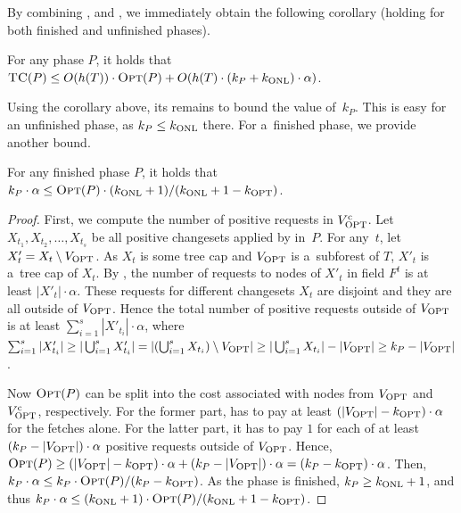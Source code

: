 By combining ,  and 
, we immediately obtain the following corollary
(holding for both finished and unfinished phases).

\begin{corollary}
\label{cor:any_phase_bound}
For any phase $P$, it holds that 
$\textsc{TC}(P) \leq O(h(T)) \cdot \textsc{Opt}(P) + O(h(T) \cdot (k_P + k_\textnormal{ONL}) \cdot \alpha)$.
\end{corollary}

Using the corollary above, its remains to bound the value of~$k_P$. This is
easy for an unfinished phase, as $k_P \leq k_\textnormal{ONL}$ there. For a~finished phase,
we provide another bound.

\begin{lemma}
\label{lem:opt_bound2}
For any finished phase $P$, it holds that
$k_P \cdot \alpha \leq \textsc{Opt}(P) \cdot (k_\textnormal{ONL} + 1) / (k_\textnormal{ONL} + 1 - k_\textnormal{OPT})$.
\end{lemma}

\begin{proof}
First, we compute the number of positive requests in $V_\textnormal{OPT}^\textrm{c}$. Let $X_{t_1},
X_{t_2}, \ldots, X_{t_s}$ be all positive changesets applied by \ALGTC in~$P$.
For any~$t$, let $X'_t = X_t \setminus V_\textnormal{OPT}$. As $X_t$ is some tree cap and
$V_\textnormal{OPT}$ is a~subforest of $T$, $X'_t$ is a~tree cap of $X_t$. By
, the number of requests to nodes of $X'_t$ in
field $F^t$ is at least $|X'_t| \cdot \alpha$. These requests for different
changesets $X_t$ are disjoint and they are all outside of $V_\textnormal{OPT}$. Hence the
total number of positive requests outside of $V_\textnormal{OPT}$ is at least $\sum_{i=1}^s
|X'_{t_i}| \cdot \alpha$, where $\sum_{i=1}^s |X'_{t_i}| \geq |\bigcup_{i=1}^s
X'_{t_i}| = |(\bigcup_{i=1}^s X_{t_i}) \setminus V_\textnormal{OPT}| \geq |\bigcup_{i=1}^s
X_{t_i}| - |V_\textnormal{OPT}| \geq k_P - |V_\textnormal{OPT}|$.

Now $\textsc{Opt}(P)$ can be split into the cost associated with nodes from $V_\textnormal{OPT}$
and $V_\textnormal{OPT}^\textrm{c}$, respectively. For the former part,
\OPT has to pay at least $(|V_\textnormal{OPT}| - k_\textnormal{OPT}) \cdot \alpha$ for the fetches
alone. For the latter part, it has to pay $1$ for each of at least $(k_P -
|V_\textnormal{OPT}|) \cdot \alpha$ positive requests outside of $V_\textnormal{OPT}$. Hence, $\textsc{Opt}(P)
\geq (|V_\textnormal{OPT}| - k_\textnormal{OPT}) \cdot \alpha + (k_P - |V_\textnormal{OPT}|) \cdot \alpha = (k_P -
k_\textnormal{OPT}) \cdot \alpha$. Then, $k_P \cdot \alpha \leq k_P \cdot \textsc{Opt}(P) / (k_P -
k_\textnormal{OPT})$. As the phase is finished, $k_P \geq k_\textnormal{ONL} + 1$, and thus $k_P \cdot
\alpha \leq (k_\textnormal{ONL} + 1) \cdot \textsc{Opt}(P) / (k_\textnormal{ONL} + 1 - k_\textnormal{OPT})$.
\end{proof}



